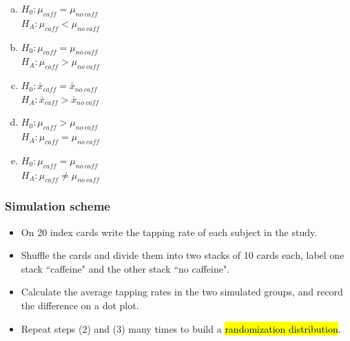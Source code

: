 \documentclass[11pt,containsverbatim,handout,xcolor=xelatex,dvipsnames,table]{beamer}
\newcommand{\solnMult}[1]{#1}
\begin{document}

\begin{frame}
\frametitle{}


\begin{enumerate}[(a)]

\item $H_0: \mu_{caff} = \mu_{no~caff}$ \\
$H_A: \mu_{caff} < \mu_{no~caff}$

\item \solnMult{$H_0: \mu_{caff} = \mu_{no~caff}$ \\
$H_A: \mu_{caff} > \mu_{no~caff}$}

\item $H_0: \bar{x}_{caff} = \bar{x}_{no~caff}$ \\
$H_A: \bar{x}_{caff} > \bar{x}_{no~caff}$

\item $H_0: \mu_{caff} > \mu_{no~caff}$ \\
$H_A: \mu_{caff} = \mu_{no~caff}$

\item $H_0: \mu_{caff} = \mu_{no~caff}$ \\
$H_A: \mu_{caff} \ne \mu_{no~caff}$

\end{enumerate}

\end{frame}


\begin{frame}
\frametitle{Simulation scheme}

\begin{itemize}

\item On 20 index cards write the tapping rate of each subject in the study.

\item Shuffle the cards and divide them into two stacks of 10 cards each, label one stack ``caffeine" and the other stack ``no caffeine".

\item Calculate the average tapping rates in the two simulated groups, and record the difference on a dot plot.

\item Repeat steps (2) and (3) many times to build a \hl{randomization distribution}.

\end{itemize}

\end{frame}
\end{document}
